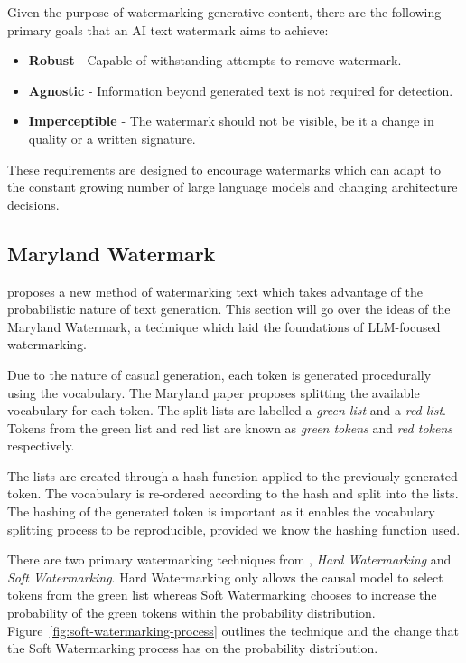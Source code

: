 \documentclass{l4proj}
\theoremstyle{definition}
\begin{document}
    Given the purpose of watermarking generative content, there are the following primary goals that an AI text watermark aims to achieve:
    \begin{itemize}
        \setlength\itemsep{0.5em}
        \item \textbf{Robust} - Capable of withstanding attempts to remove watermark.
        \item \textbf{Agnostic} - Information beyond generated text is not required for detection.
        \item \textbf{Imperceptible} - The watermark should not be visible, be it a change in quality or a written signature.
    \end{itemize}

    These requirements are designed to encourage watermarks which can adapt to the constant growing number of large language models and changing architecture decisions.
    
    \subsection{Maryland Watermark}
        \label{sec:maryland-watermark}
        \citet{kirchenbauer2023watermark} proposes a new method of watermarking text which takes advantage of the probabilistic nature of text generation. This section will go over the ideas of the Maryland Watermark, a technique which laid the foundations of LLM-focused watermarking.

        Due to the nature of casual generation, each token is generated procedurally using the vocabulary. The Maryland paper proposes splitting the available vocabulary for each token. The split lists are labelled a \emph{green list} and a \emph{red list}. Tokens from the green list and red list are known as \emph{green tokens} and \emph{red tokens} respectively.
        
        The lists are created through a hash function applied to the previously generated token. The vocabulary is re-ordered according to the hash and split into the lists. The hashing of the generated token is important as it enables the vocabulary splitting process to be reproducible, provided we know the hashing function used.

        There are two primary watermarking techniques from \citet{kirchenbauer2023watermark}, \emph{Hard Watermarking} and \emph{Soft Watermarking}. Hard Watermarking only allows the causal model to select tokens from the green list whereas Soft Watermarking chooses to increase the probability of the green tokens within the probability distribution. Figure~\ref{fig:soft-watermarking-process} outlines the technique and the change that the Soft Watermarking process has on the probability distribution.
\end{document}
